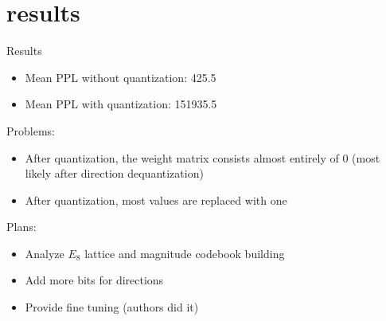 \section{results}

\begin{frame}{Results}
    \begin{itemize}
        \item Mean PPL without quantization: 425.5
        \item Mean PPL with quantization: 151935.5
    \end{itemize}
    Problems:
    \begin{itemize}
        \item After quantization, the weight matrix consists almost entirely of 0 (most likely after direction dequantization)
        \item After quantization, most values are replaced with one
    \end{itemize}
    Plans:
    \begin{itemize}
        \item Analyze $E_8$ lattice and magnitude codebook building
        \item Add more bits for directions
        \item Provide fine tuning (authors did it)
    \end{itemize}
\end{frame}
